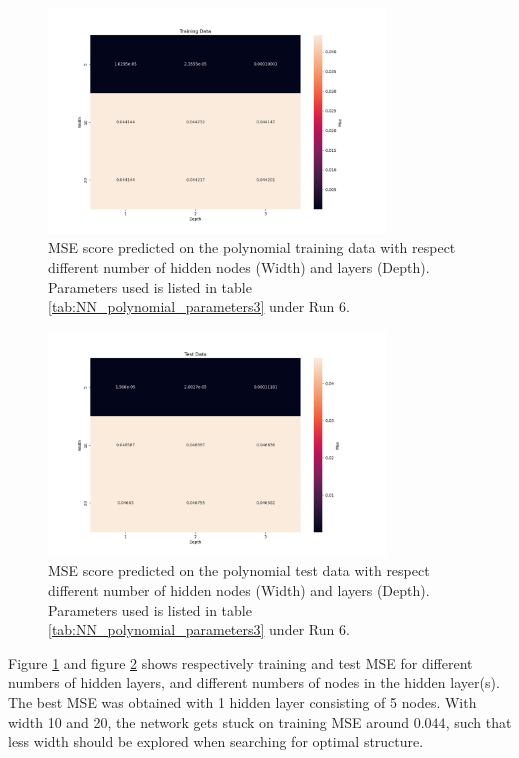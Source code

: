 \begin{figure}[H]
    \centering
    \includegraphics[width=0.8\textwidth]{Figures/PartB/heatmap_train_polydata_width_vs_depth.png}
    \caption{MSE score predicted on the polynomial training data with respect
    different number of hidden nodes (Width) and layers (Depth). Parameters
used is listed in table \ref{tab:NN_polynomial_parameters3} under Run 6.}  
    \label{fig:polydata_train_width_vs_depth} 

\end{figure}

\begin{figure}[H]
    \centering
    \includegraphics[width=0.8\textwidth]{Figures/PartB/heatmap_test_polydata_width_vs_depth.png}
    \caption{MSE score predicted on the polynomial test data with respect
    different number of hidden nodes (Width) and layers (Depth). Parameters
used is listed in table \ref{tab:NN_polynomial_parameters3} under Run 6.}  
    \label{fig:polydata_test_width_vs_depth} 
\end{figure}


Figure \ref{fig:polydata_train_width_vs_depth} and figure \ref{fig:polydata_test_width_vs_depth} shows 
respectively training and test MSE for different numbers of hidden layers, and different numbers of 
nodes in the hidden layer(s). The best MSE was obtained 
with 1 hidden layer consisting of 5 nodes. With width 10 and 20, the network gets stuck on training MSE around
$0.044$, such that less width should be explored when searching for optimal structure.  

